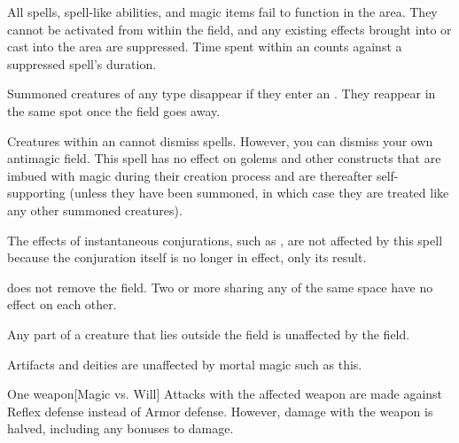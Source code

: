 \spelldur{\durlong \dismissable}
\spellline
\spelleffect All spells, spell-like abilities, and magic items fail to function in the area. They cannot be activated from within the field, and any existing effects brought into or cast into the area are suppressed. Time spent within an  counts against a suppressed spell's duration.
\par Summoned creatures of any type disappear if they enter an . They reappear in the same spot once the field goes away. 
\par Creatures within an  cannot dismiss spells. However, you can dismiss your own antimagic field.
\spellnotes This spell has no effect on golems and other constructs that are imbued with magic during their creation process and are thereafter self-supporting (unless they have been summoned, in which case they are treated like any other summoned creatures).

The effects of instantaneous conjurations, such as , are not affected by this spell because the conjuration itself is no longer in effect, only its result.

\par {} does not remove the field. Two or more  sharing any of the same space have no effect on each other.
\par Any part of a creature that lies outside the field is unaffected by the field.
\par Artifacts and deities are unaffected by mortal magic such as this. 

\spellrng{\rngclose}
\spelldur{\durshort \dismissable}
\begin{spelltarget}{One weapon}[Magic vs. Will]
    \spellsuccess Attacks with the affected weapon are made against Reflex defense instead of Armor defense. However, damage with the weapon is halved, including any bonuses to damage.
\end{spelltarget}

